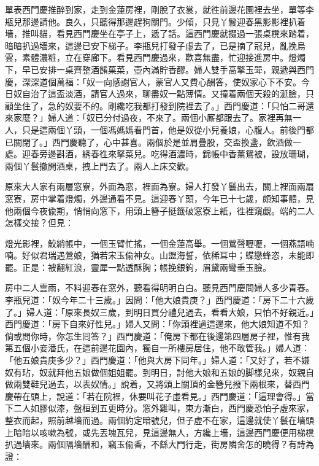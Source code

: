 單表西門慶推醉到家，走到金蓮房裡，剛脫了衣裳，就徃前邊花園裡去坐，單等李瓶兒那邊請他。良久，只聽得那邊趕狗關門。{}少傾，只見丫鬟迎春黑影影裡扒着墻，推叫貓，{}看見西門慶坐在亭子上，遞了話。這西門慶就掇過一張桌櫈來踏着，暗暗扒過墻來，這邊已安下梯子。李瓶兒打發子虛去了，已是摘了冠兒，亂挽烏雲，素體濃粧，立在穿廊下。{}看見西門慶過來，歡喜無盡，忙迎接進房中。燈燭下，早已安排一桌齊整酒餚菓菜，壺內滿貯香醪。婦人雙手高擎玉斝，親遞與西門慶，深深道個萬福：「奴一向感謝官人，蒙官人又費心酬答，使奴家心下不安。今日奴自治了這盃淡酒，請官人過來，聊盡奴一點薄情。{}又撞着兩個天殺的涎臉，只顧坐住了，急的奴要不的。剛纔吃我都打發到院裡去了。」西門慶道：「只怕二哥還來家麼？」婦人道：「奴已分付過夜，不來了。兩個小厮都跟去了。家裡再無一人，只是這兩個丫頭，一個馮媽媽看門首，他是奴從小兒養娘，心腹人。前後門都已關閉了。」西門慶聽了，心中甚喜。兩個於是並肩疊股，交盃換盞，飲酒做一處。迎春旁邊斟酒，綉春徃來拏菜兒。吃得酒濃時，錦帳中香薰鴛被，設放珊瑚，兩個丫鬟撤開酒桌，拽上門去了。兩人上床交歡。

原來大人家有兩層窓寮，外面為窓，裡面為寮。婦人打發丫鬟出去，關上裡面兩扇窓寮，房中掌着燈燭，外邊通看不見。這迎春丫頭，今年已十七歲，頗知事體，見他兩個今夜偸期，悄悄向窓下，用頭上簪子挺籤破窓寮上紙，徃裡窺覷。端的二人怎樣交接？但見：

\begin{myquote}
燈光影裡，鮫綃帳中，一個玉臂忙搖，一個金蓮高舉。一個鶯聲嚦嚦，一個燕語喃喃。好似君瑞遇鶯娘，猶若宋玉偸神女。山盟海誓，依稀耳中；蝶戀蜂恣，未能即罷。正是：被翻紅浪，靈犀一點透酥胸；帳挽銀鉤，眉黛兩彎垂玉臉。
\end{myquote}

房中二人雲雨，不料迎春在窓外，聽看得明明白白。聽見西門慶問婦人多少青春。李瓶兒道：「奴今年二十三歲。」因問：「他大娘貴庚？」西門慶道：「房下二十六歲了。」婦人道：「原來長奴三歲，到明日買分禮兒過去，看看大娘，只怕不好親近。」{}西門慶道：「房下自來好性兒。」婦人又問：「你頭裡過這邊來，他大娘知道不知？倘或問你時，你怎生囘答？」西門慶道：「俺房下都在後邊第四層房子裡，惟有我第五個小妾潘氏，在這前邊花園內，獨自一所樓房居住，他不敢管我。」婦人道：「他五娘貴庚多少？」西門慶道：「他與大房下同年。」婦人道：「又好了，若不嫌奴有玷，奴就拜他五娘做個姐姐罷。到明日，討他大娘和五娘的脚樣兒來，奴親自做兩雙鞋兒過去，以表奴情。」說着，又將頭上關頂的金簪兒撥下兩根來，替西門慶帶在頭上，說道：「若在院裡，休要叫花子虛看見。」西門慶道：「這理會得。」當下二人如膠似漆，盤桓到五更時分。窓外雞叫，東方漸白，西門慶恐怕子虛來家，整衣而起，照前越墻而過。兩個約定暗號兒，但子虛不在家，這邊就使丫鬟在墻頭上暗暗以咳嗽為號，或先丟塊瓦兒，見這邊無人，方纔上墻，這邊西門慶便用梯櫈扒過墻來。兩個隔墻酬和，竊玉偸香，不繇大門行走，街房隣舍怎的曉得？有詩為證：

